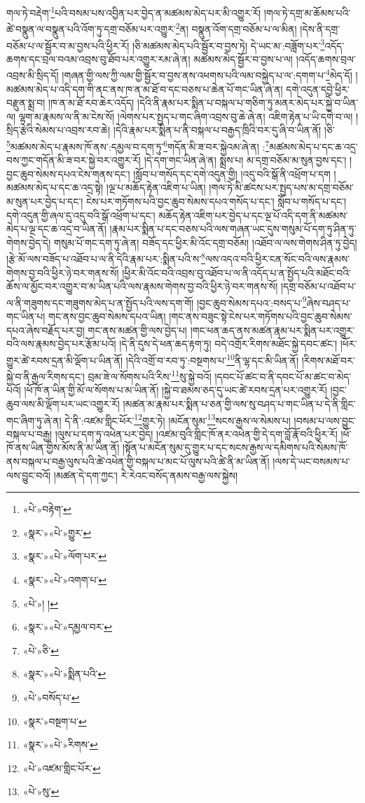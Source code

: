 གལ་ཏེ་བརྡེག་\footnote{«པེ་»བརྟེག་}པའི་བསམ་པས་འབྱིན་པར་བྱེད་ན་མཚམས་མེད་པར་མི་འགྱུར་རོ། །གལ་ཏེ་དགྲ་མ་ཆོམས་པའི་ཚེ་བསྣུན་ལ་བསྣུན་པའི་འོག་ཏུ་དགྲ་བཅོམ་པར་འགྱུར་\footnote{«སྣར་»«པེ་»གྱུར་}ན། བསྣུན་འོག་དགྲ་བཅོམ་པ་ལ་མིན། །དེས་ནི་དགྲ་བཅོམ་པ་ལ་སྦྱོར་བ་མ་བྱས་པའི་ཕྱིར་རོ། །ཅི་མཚམས་མེད་པའི་སྦྱོར་བ་བྱས་ཏེ། དེ་ཡང་མ་:བཟློག་པར་\footnote{«སྣར་»«པེ་»ལོག་པར་}འདོད་ཆགས་དང་བྲལ་བའམ་འབྲས་བུ་ཐོབ་པར་འགྱུར་རམ་ཞེ་ན། མཚམས་མེད་སྦྱོར་བ་བྱས་པ་ལ། །འདོད་ཆགས་བྲལ་འབྲས་མི་སྲིད་དོ། །གཞན་གྱི་ལས་ཀྱི་ལམ་གྱི་སྦྱོར་བ་བྱས་ནས་འཕགས་པའི་ལམ་བསྐྱེད་པ་ལ་:དགག་པ་\footnote{«སྣར་»«པེ་»འགག་པ་}མེད་དོ། །མཚམས་མེད་པ་འདི་དག་གི་ནང་ནས་ཁ་ན་མ་ཐོ་བ་དང་བཅས་པ་ཆེན་པོ་གང་ཡིན་ཞེ་ན། དགེ་འདུན་དབྱེ་ཕྱིར་བརྫུན་སྨྲ་བ། །ཁ་ན་མ་ཐོ་རབ་ཆེར་འདོད། །དེའི་ནི་རྣམ་པར་སྨིན་པ་བསྐལ་པ་གཅིག་ཏུ་མནར་མེད་པར་སྐྱེ་བ་ཡིན་ལ། ལྷག་མ་རྣམས་ལ་ནི་མ་ངེས་སོ། །ལེགས་པར་སྤྱད་པ་གང་ཞིག་འབྲས་བུ་ཆེ་ཞེ་ན། འཇིག་རྟེན་པ་ཡི་དགེ་བ་ལ། །སྲིད་རྩེའི་སེམས་པ་འབྲས་རབ་ཆེ། །དེའི་རྣམ་པར་སྨིན་པ་ནི་བསྐལ་པ་བརྒྱད་ཁྲིའི་བར་དུ་ཞི་བ་ཡིན་ནོ། །ཅི་\footnote{«པེ་»། །}མཚམས་མེད་པ་རྣམས་ཁོ་ནས་:དམྱལ་བ་དག་ཏུ་\footnote{«སྣར་»«པེ་»དམྱལ་བར་}གདོན་མི་ཟ་བར་སྐྱེའམ་ཞེ་ན། :\footnote{«པེ་»ཅི་}མཚམས་མེད་པ་དང་ཆ་འདྲ་བས་ཀྱང་གདོན་མི་ཟ་བར་སྐྱེ་བར་འགྱུར་རོ། །དེ་དག་གང་ཡིན་ཞེ་ན། སྨྲས་པ། མ་དགྲ་བཅོམ་མ་སུན་བྱས་དང་། །བྱང་ཆུབ་སེམས་དཔའ་ངེས་གནས་དང་། །སློབ་པ་གསོད་དང་དགེ་འདུན་གྱི། །འདུ་བའི་སྒོ་ནི་འཕྲོག་པ་དག །མཚམས་མེད་པ་དང་ཆ་འདྲ་སྟེ། །ལྔ་པ་མཆོད་རྟེན་འཇིག་པ་ཡིན། །གལ་ཏེ་མི་ཚངས་པར་སྤྱད་པས་མ་དགྲ་བཅོམ་མ་སུན་པར་བྱེད་པ་དང་། ངེས་པར་གཏོགས་པའི་བྱང་ཆུབ་སེམས་དཔའ་གསོད་པ་དང་། སློབ་པ་གསོད་པ་དང་། དགེ་འདུན་གྱི་ཞལ་དུ་འདུ་བའི་སྒོ་འཕྲོག་པ་དང་། མཆོད་རྟེན་འཇིག་པར་བྱེད་པ་དང་ལྔ་པོ་འདི་དག་ནི་མཚམས་མེད་པ་ལྔ་དང་ཆ་འདྲ་བ་ཡིན་ནོ། །རྣམ་པར་སྨིན་པ་དང་བཅས་པའི་ལས་གཞན་ཡང་དུས་གསུམ་པོ་དག་ཏུ་ཤིན་ཏུ་གེགས་བྱེད་དེ། གསུམ་པོ་གང་དག་ཏུ་ཞེ་ན། བཟོད་དང་ཕྱིར་མི་འོང་དགྲ་བཅོམ། །འཐོབ་ལ་ལས་གེགས་ཤིན་ཏུ་བྱེད། །རྩེ་མོ་ལས་བཟོད་པ་འཐོབ་པ་ལ་ནི་དེའི་རྣམ་པར་:སྨིན་པའི་ས་\footnote{«སྣར་»«པེ་»སྨིན་པའི་}ལས་འདའ་བའི་ཕྱིར་ངན་སོང་བའི་ལས་རྣམས་གེགས་བྱ་བའི་ཕྱིར་ཉེ་བར་གནས་སོ། །ཕྱིར་མི་འོང་བའི་འབྲས་བུ་འཐོབ་པ་ལ་ནི་འདོད་པ་ན་སྤྱོད་པའི་མཐོང་བའི་ཆོས་ལ་མྱོང་བར་འགྱུར་བ་མ་ཡིན་པའི་ལས་རྣམས་གེགས་བྱ་བའི་ཕྱིར་ཉེ་བར་གནས་སོ། །དགྲ་བཅོམ་པ་འཐོབ་པ་ལ་ནི་གཟུགས་དང་གཟུགས་མེད་པ་ན་སྤྱོད་པའི་ལས་དག་གོ། །བྱང་ཆུབ་སེམས་དཔའ་:བསད་པ་\footnote{«པེ་»བསོད་པ་}ཞེས་བཤད་པ་གང་ཡིན་པ། གང་ནས་བྱང་ཆུབ་སེམས་དཔའ་ཡིན། །གང་ནས་བཟུང་སྟེ་ངེས་པར་གཏོགས་པའི་བྱང་ཆུབ་སེམས་དཔའ་ཞེས་བརྗོད་པར་བྱ། གང་ནས་མཚན་གྱི་ལས་བྱེད་པ། །གང་ཕན་ཆད་ནས་མཚན་རྣམ་པར་སྨིན་པར་འགྱུར་བའི་ལས་རྣམས་བྱེད་པར་རྩོམ་པའོ། །དེ་ནི་དུས་དེ་ཕན་ཆད་རྟག་ཏུ། བདེ་འགྲོར་རིགས་མཐོང་སྐྱེ་དབང་ཚང་། །ཕོར་གྱུར་ཚེ་རབས་དྲན་མི་ལྡོག་པ་ཡིན་ནོ། །དེའི་འགྲོ་བ་རབ་ཏུ་:བསྔགས་པ་\footnote{«སྣར་»བསྔག་པ་}ནི་ལྷ་དང་མི་ཡིན་ནོ། །རིགས་མཐོ་བར་སྐྱེ་བ་ནི་རྒྱལ་རིགས་དང་། བྲམ་ཟེ་ལ་སོགས་པའི་རིས་\footnote{«སྣར་»«པེ་»རིགས་}སུ་སྐྱེ་བའོ། །དབང་པོ་ཚང་བ་ནི་དབང་པོ་མ་ཚང་བ་མེད་པའོ། །ཕོ་ཁོ་ན་ཡིན་གྱི་མོ་ལ་སོགས་པ་མ་ཡིན་ནོ། །སྐྱེ་བ་ཐམས་ཅད་དུ་ཡང་ཚེ་རབས་དྲན་པར་འགྱུར་རོ། །བྱང་ཆུབ་ལས་མི་ལྡོག་པར་ཡང་འགྱུར་རོ། །མཚན་མ་རྣམ་པར་སྨིན་པ་ཅན་གྱི་ལས་སུ་བཤད་པ་གང་ཡིན་པ་དེ་ནི་གླིང་གང་ཞིག་ཏུ་ཞེ་ན། དེ་ནི་:འཛམ་གླིང་ཕོར་\footnote{«པེ་»འཛམ་གླིང་པོར་}གྱུར་ཏེ། །མངོན་སུམ་\footnote{«པེ་»སུ་}སངས་རྒྱས་ལ་སེམས་པ། །བསམ་པ་ལས་བྱུང་བསྐལ་པ་བརྒྱ། །ལུས་པ་དག་ཏུ་འཕེན་པར་བྱེད། །འཛམ་བུའི་གླིང་ཁོ་ནར་འཕེན་གྱི་དེ་དག་བློ་རྣོ་བའི་ཕྱིར་རོ། །ཕོ་ཁོ་ནས་ཡིན་གྱིས་མོས་ནི་མ་ཡིན་ནོ། །སྟོན་པ་མངོན་སུམ་དུ་གྱུར་པ་དང་སངས་རྒྱས་ལ་དམིགས་པའི་སེམས་ཁོ་ནས་བསྐལ་པ་བརྒྱ་ལུས་པའི་ཚེ་འཕེན་གྱི་བསྐལ་པ་མང་པོ་ལུས་པའི་ཚེ་ནི་མ་ཡིན་ནོ། །ལས་དེ་ཡང་བསམས་པ་ལས་བྱུང་བའོ། །མཚན་དེ་དག་ཀྱང་། རེ་རེའང་བསོད་ནམས་བརྒྱ་ལས་སྐྱེས། 
